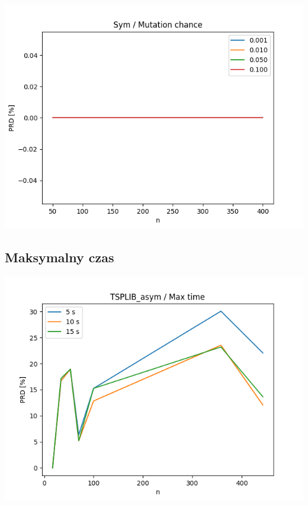 \documentclass{article}
\begin{document}
\begin{center}
\includegraphics[width=\textwidth, 
                   height = 0.4\textheight, 
                   keepaspectratio]
                  {plots/sym_8_mut_chance} 
\end{center}


\subsection{Maksymalny czas}

\begin{center}
\includegraphics[width=\textwidth, 
                   height = 0.4\textheight, 
                   keepaspectratio]
                  {plots/tsplib_asym_9_max_time} 
\end{center}
\end{document}
